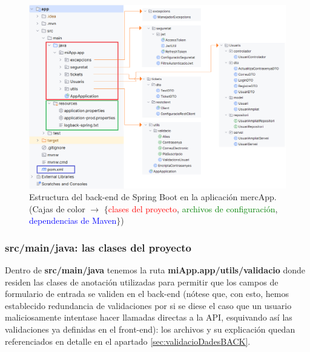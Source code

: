 \documentclass[a4paper,12pt]{report}
\begin{document}
				
				\setlength{\belowcaptionskip}{3pt}
				\FloatBarrier
				\begin{figure}[H]
					\centering
					\caption{Estructura del back-end de Spring Boot en la aplicación mercApp. \\ {\footnotesize (Cajas de color $\rightarrow$ $\{$\textcolor{red}{clases del proyecto}, \textcolor{green}{archivos de configuración}, \textcolor{blue}{dependencias de Maven}$\}$) }}
					\includegraphics[width=1\textwidth]{img/estrucutraAplicacioJAVARESOURCES_final_rallat.png}
					
					\label{fig:estrucutraAplicacioJAVARESOURCES} 
				\end{figure}
				\FloatBarrier
				
				

				

				\subsubsection{src/main/java: las clases del proyecto}
				\label{sec:classesProjecteSpringboot}
				
				Dentro de \textbf{src/main/java} tenemos la ruta \textbf{miApp.app/utils/validacio}	donde residen las clases de anotación utilizadas para permitir que los campos de formulario de entrada se validen en el back-end (nótese que, con esto, hemos establecido redundancia de validaciones por si se diese el caso que un usuario maliciosamente intentase hacer llamadas directas a la API, esquivando así las validaciones ya definidas en el front-end): los archivos y su explicación quedan referenciados en detalle en el apartado \ref{sec:validacioDadesBACK}.
				
\end{document}
